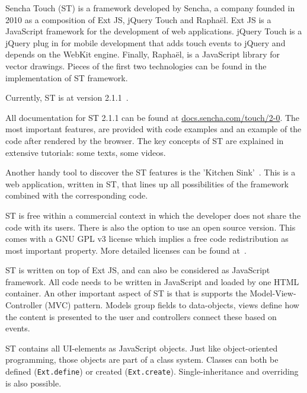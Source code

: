 \documentclass[a4paper]{artikel3}
\newcommand{\code}[1]{\texttt{#1}}
\renewcommand{\url}[1]{\href{http://#1}{#1}}
\renewcommand{\paragraph}[1]{\vspace{2mm} \noindent {\bf #1}  }
\begin{document}
Sencha Touch	 (ST) is a framework developed by Sencha,  a company founded in 2010 as a composition of Ext JS, jQuery Touch and Raphaël.  Ext JS is a JavaScript framework for the development of web applications.  jQuery Touch is a jQuery plug in for mobile development that adds touch events to jQuery and depends on the WebKit engine.  Finally,  Raphaël, is a JavaScript library for vector drawings.  Pieces of the first two technologies can be found in the implementation of ST framework.    

Currently,  ST is at version 2.1.1~\cite{Inc.}.

\paragraph{Documentation}
All documentation for ST 2.1.1 can be found at \url{docs.sencha.com/touch/2-0}.  The most important features,  are provided with code examples and an example of the code after rendered by the browser.  The key concepts of ST are explained in extensive tutorials:  some texts, some videos.  

Another handy tool to discover the ST features is the 'Kitchen Sink'~\cite{Inc.2013}.  This is a web application,  written in ST,  that lines up all possibilities of the framework combined with the corresponding code.

\paragraph{Licenses}
ST is free within a commercial context in which the developer does not share the code with its users.  There is also the option to use an open source version.  This comes with a GNU GPL v3 license which implies a free code redistribution as most important property.
More detailed licenses can be found at~\cite{SenchaInc.}.
  
\paragraph{Code and development}
ST is written on top of Ext JS,  and can also be considered as JavaScript framework.  All code needs to be written in JavaScript and loaded by one HTML container.  An other important aspect of ST is that is supports the Model-View-Controller (MVC) pattern.  Models group fields to data-objects,  views define how the content is presented to the user and controllers connect these based on events.

ST contains all UI-elements as JavaScript objects.  Just like object-oriented programming,  those objects are part of a class system.  Classes can both be defined (\code{Ext.define}) or created (\code{Ext.create}).  Single-inheritance and overriding is also possible.    
\end{document}
